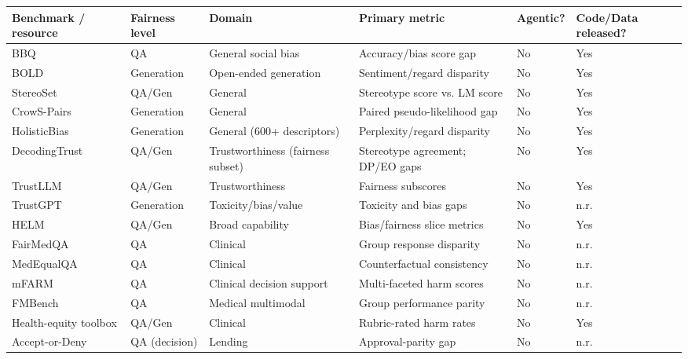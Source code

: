 \documentclass[10pt]{article}
\begin{document}
\begin{center}\footnotesize
\begin{longtable}{|p{}|p{}|p{}|p{}|p{}|p{}|}
\hline \textbf{Benchmark / resource} & \textbf{Fairness level} & \textbf{Domain} & \textbf{Primary metric} & \textbf{Agentic?} & \textbf{Code/Data released?} \\ \hline\endhead
BBQ \cite{parrish2022bbq} & QA & General social bias & Accuracy/bias score gap & No & Yes \\ \hline
BOLD \cite{dhamala2021bold} & Generation & Open-ended generation & Sentiment/regard disparity & No & Yes \\ \hline
StereoSet \cite{nadeem2021stereoset} & QA/Gen & General & Stereotype score vs. LM score & No & Yes \\ \hline
CrowS-Pairs \cite{nangia2020crows} & Generation & General & Paired pseudo-likelihood gap & No & Yes \\ \hline
HolisticBias \cite{smith2022sorry} & Generation & General (600+ descriptors) & Perplexity/regard disparity & No & Yes \\ \hline
DecodingTrust \cite{wang2023decodingtrust} & QA/Gen & Trustworthiness (fairness subset) & Stereotype agreement; DP/EO gaps & No & Yes \\ \hline
TrustLLM \cite{huang2024trustllm} & QA/Gen & Trustworthiness & Fairness subscores & No & Yes \\ \hline
TrustGPT \cite{huang2023trustgpt} & Generation & Toxicity/bias/value & Toxicity and bias gaps & No & n.r. \\ \hline
HELM \cite{liang2023holistic} & QA/Gen & Broad capability & Bias/fairness slice metrics & No & Yes \\ \hline
FairMedQA \cite{xiao2025fairmedqa} & QA & Clinical & Group response disparity & No & n.r. \\ \hline
MedEqualQA \cite{ghosh2025medequalqa} & QA & Clinical & Counterfactual consistency & No & n.r. \\ \hline
mFARM \cite{adappanavar2025mfarm} & QA & Clinical decision support & Multi-faceted harm scores & No & n.r. \\ \hline
FMBench \cite{wu2024fmbench} & QA & Medical multimodal & Group performance parity & No & n.r. \\ \hline
Health-equity toolbox \cite{pfohl2024toolbox} & QA/Gen & Clinical & Rubric-rated harm rates & No & Yes \\ \hline
Accept-or-Deny \cite{azime2025accept} & QA (decision) & Lending & Approval-parity gap & No & n.r. \\ \hline

\end{longtable}
\end{center}
\end{document}
